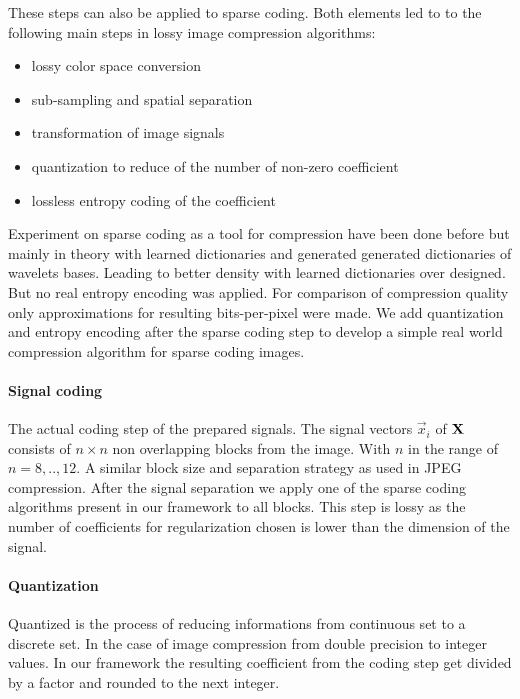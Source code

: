 These steps can also be applied to sparse coding. Both elements
led to to the following main steps in lossy image compression algorithms:
\begin{itemize}
 \item lossy color space conversion
 \item sub-sampling and spatial separation
 \item transformation of image signals
 \item quantization to reduce of the number of non-zero coefficient 
 \item lossless entropy coding of the coefficient 
\end{itemize}


Experiment on sparse coding as a tool for compression have been done
before\cite{Lewicki1999,?} but mainly in theory with learned dictionaries and
generated generated dictionaries of wavelets bases. Leading to better density
with learned dictionaries over designed. But no real entropy encoding was
applied. For comparison of compression quality only approximations for
resulting bits-per-pixel were made. We add quantization and entropy encoding
after the sparse coding step to develop a simple real world compression
algorithm for sparse coding images.



\paragraph{Signal coding}
The actual coding step of the prepared signals. The signal vectors $\vec{x}_i$
of $\boldsymbol{\mathrm{X}}$ consists of $n \times n$ non overlapping blocks from the image.
With $n$ in the range of $n=8,..,12$. A similar block size and separation
strategy as used in JPEG compression. After the signal separation we apply one
of the sparse coding algorithms present in our framework to all blocks. This
step is lossy as the number of coefficients for regularization chosen is lower
than the dimension of the signal. 

\paragraph{Quantization}
Quantized is the process of reducing informations from continuous set to a
discrete set. In the case of image compression from double precision to integer
values. In our framework the resulting coefficient from the coding step get
divided by a factor and rounded to the next integer.  

